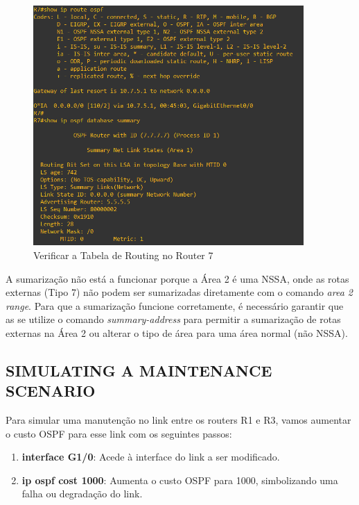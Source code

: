 \documentclass[11pt,english, openright, oneside]{book}
\begin{document}
\begin{figure}[H]
  \centering
  \includegraphics[width=0.92\textwidth]{imagens/Tarefa5/24.show_ip_route_R7.png}
  \caption{Verificar a Tabela de Routing no Router 7}
  \label{fig:config42}
\end{figure}
\vspace{0.2cm}

\par A sumarização não está a funcionar porque a Área 2 é uma NSSA, onde as rotas externas (Tipo 7) não podem ser sumarizadas diretamente com o comando \textit{area 2 range}. Para que a sumarização funcione corretamente, é necessário garantir que as se utilize o comando \textit{summary-address} para permitir a sumarização de rotas externas na Área 2 ou alterar o tipo de área para uma área normal (não NSSA).

\subsection{SIMULATING A MAINTENANCE SCENARIO}
\vspace{0.2cm}

Para simular uma manutenção no link entre os routers R1 e R3, vamos aumentar o custo OSPF para esse link com os seguintes passos:
\vspace{0.2cm}

\begin{enumerate}
  \item \textbf{interface G1/0}: Acede à interface do link a ser modificado.
  \item \textbf{ip ospf cost 1000}: Aumenta o custo OSPF para 1000, simbolizando uma falha ou degradação do link.
\end{enumerate}
\vspace{0.2cm}
\end{document}
